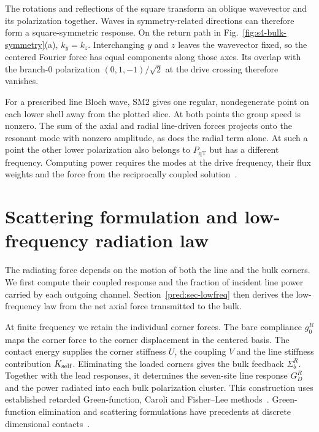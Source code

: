 \documentclass[10pt,aps,onecolumn,floatfix,notitlepage,nofootinbib,showkeys]{revtex4-2}
\newcommand{\PqT}{P_{\mathrm{qT}}}
\begin{document}
The rotations and reflections of the square transform an oblique wavevector and its polarization together. Waves in symmetry-related directions can therefore form a square-symmetric response. On the return path in Fig.~\ref{fig:s4-bulk-symmetry}(a), $k_y=k_z$. Interchanging $y$ and $z$ leaves the wavevector fixed, so the centered Fourier force has equal components along those axes. Its overlap with the branch-0 polarization $(0,1,-1)/\sqrt{2}$ at the drive crossing therefore vanishes.

For a prescribed line Bloch wave, SM2 gives one regular, nondegenerate point on each lower shell away from the plotted slice. At both points the group speed is nonzero. The sum of the axial and radial line-driven forces projects onto the resonant mode with nonzero amplitude, as does the radial term alone. At such a point the other lower polarization also belongs to $\PqT$ but has a different frequency. Computing power requires the modes at the drive frequency, their flux weights and the force from the reciprocally coupled solution~\cite{Sadasivam2017,Ong2018,Khodavirdi2024}.



\section{Scattering formulation and low-frequency radiation law}
\label{sec:s5-scattering}

The radiating force depends on the motion of both the line and the bulk corners. We first compute their coupled response and the fraction of incident line power carried by each outgoing channel. Section~\ref{pred:sec-lowfreq} then derives the low-frequency law from the net axial force transmitted to the bulk.

At finite frequency we retain the individual corner forces. The bare compliance $g_0^R$ maps the corner force to the corner displacement in the centered basis. The contact energy supplies the corner stiffness $U$, the coupling $V$ and the line stiffness contribution $K_{\rm self}$. Eliminating the loaded corners gives the bulk feedback $\Sigma_b^R$. Together with the lead responses, it determines the seven-site line response $G_D^R$ and the power radiated into each bulk polarization cluster. This construction uses established retarded Green-function, Caroli and Fisher--Lee methods~\cite{BornHuang1954,Caroli1971,FisherLee1981,Sadasivam2017,Ong2018,Khodavirdi2024}. Green-function elimination and scattering formulations have precedents at discrete dimensional contacts~\cite{PanzerGoodson2008,PanzerGoodson2011Erratum,DucheminDonadio2011}.
\end{document}
